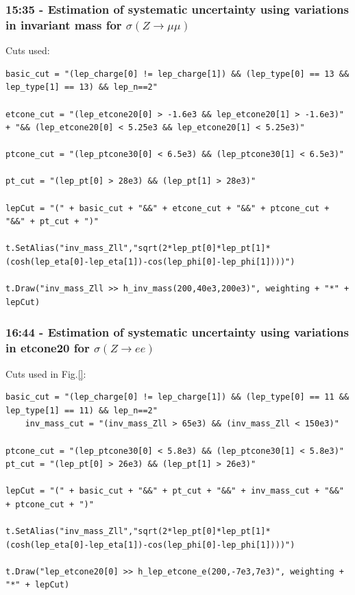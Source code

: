 \subsubsection*{15:35 - Estimation of systematic uncertainty using variations in invariant mass for $\sigma (Z \rightarrow \mu\mu)$}

Cuts used:
\begin{lstlisting}
basic_cut = "(lep_charge[0] != lep_charge[1]) && (lep_type[0] == 13 && lep_type[1] == 13) && lep_n==2"

etcone_cut = "(lep_etcone20[0] > -1.6e3 && lep_etcone20[1] > -1.6e3)" + "&& (lep_etcone20[0] < 5.25e3 && lep_etcone20[1] < 5.25e3)"

ptcone_cut = "(lep_ptcone30[0] < 6.5e3) && (lep_ptcone30[1] < 6.5e3)"

pt_cut = "(lep_pt[0] > 28e3) && (lep_pt[1] > 28e3)"
    
lepCut = "(" + basic_cut + "&&" + etcone_cut + "&&" + ptcone_cut + "&&" + pt_cut + ")"
    
t.SetAlias("inv_mass_Zll","sqrt(2*lep_pt[0]*lep_pt[1]*(cosh(lep_eta[0]-lep_eta[1])-cos(lep_phi[0]-lep_phi[1])))")
  
t.Draw("inv_mass_Zll >> h_inv_mass(200,40e3,200e3)", weighting + "*" + lepCut)
\end{lstlisting}


\subsubsection*{16:44 - Estimation of systematic uncertainty using variations in etcone20 for $\sigma (Z \rightarrow ee)$}
Cuts used in Fig.\ref{}:
\begin{lstlisting}
basic_cut = "(lep_charge[0] != lep_charge[1]) && (lep_type[0] == 11 && lep_type[1] == 11) && lep_n==2"
    inv_mass_cut = "(inv_mass_Zll > 65e3) && (inv_mass_Zll < 150e3)"

ptcone_cut = "(lep_ptcone30[0] < 5.8e3) && (lep_ptcone30[1] < 5.8e3)"
pt_cut = "(lep_pt[0] > 26e3) && (lep_pt[1] > 26e3)"
 
lepCut = "(" + basic_cut + "&&" + pt_cut + "&&" + inv_mass_cut + "&&" + ptcone_cut + ")"
    
t.SetAlias("inv_mass_Zll","sqrt(2*lep_pt[0]*lep_pt[1]*(cosh(lep_eta[0]-lep_eta[1])-cos(lep_phi[0]-lep_phi[1])))")
    
t.Draw("lep_etcone20[0] >> h_lep_etcone_e(200,-7e3,7e3)", weighting + "*" + lepCut)
\end{lstlisting}

